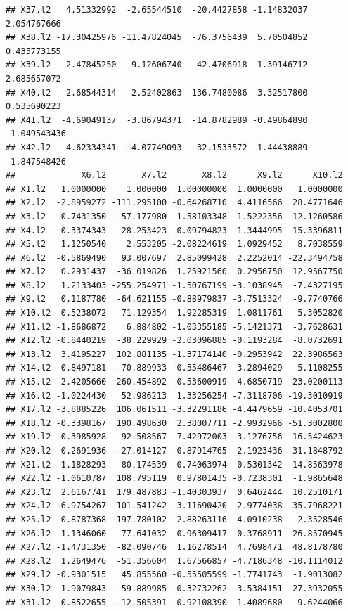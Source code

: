 \documentclass[]{article}
\begin{document}
\begin{verbatim}
## X37.l2   4.51332992  -2.65544510  -20.4427858 -1.14832037  2.054767666
## X38.l2 -17.30425976 -11.47824045  -76.3756439  5.70504852  0.435773155
## X39.l2  -2.47845250   9.12606740  -42.4706918 -1.39146712  2.685657072
## X40.l2   2.68544314   2.52402863  136.7480086  3.32517800  0.535690223
## X41.l2  -4.69049137  -3.86794371  -14.8782989 -0.49864890 -1.049543436
## X42.l2  -4.62334341  -4.07749093   32.1533572  1.44438889 -1.847548426
##             X6.l2       X7.l2       X8.l2      X9.l2      X10.l2
## X1.l2   1.0000000    1.000000  1.00000000  1.0000000   1.0000000
## X2.l2  -2.8959272 -111.295100 -0.64268710  4.4116566  28.4771646
## X3.l2  -0.7431350  -57.177980 -1.58103348 -1.5222356  12.1260586
## X4.l2   0.3374343   28.253423  0.09794823 -1.3444995  15.3396811
## X5.l2   1.1250540    2.553205 -2.08224619  1.0929452   8.7038559
## X6.l2  -0.5869490   93.007697  2.85099428  2.2252014 -22.3494758
## X7.l2   0.2931437  -36.019826  1.25921560  0.2956750  12.9567750
## X8.l2   1.2133403 -255.254971 -1.50767199 -3.1038945  -7.4327195
## X9.l2   0.1187780  -64.621155 -0.88979837 -3.7513324  -9.7740766
## X10.l2  0.5238072   71.129354  1.92285319  1.0811761   5.3052820
## X11.l2 -1.8686872    6.884802 -1.03355185 -5.1421371  -3.7628631
## X12.l2 -0.8440219  -38.229929 -2.03096885 -0.1193284  -8.0732691
## X13.l2  3.4195227  102.881135 -1.37174140 -0.2953942  22.3986563
## X14.l2  0.8497181  -70.889933  0.55486467  3.2894029  -5.1108255
## X15.l2 -2.4205660 -260.454892 -0.53600919 -4.6850719 -23.0200113
## X16.l2 -1.0224430   52.986213  1.33256254 -7.3118706 -19.3010919
## X17.l2 -3.8885226  106.061511 -3.32291186 -4.4479659 -10.4053701
## X18.l2 -0.3398167  190.498630  2.38007711 -2.9932966 -51.3002800
## X19.l2 -0.3985928   92.508567  7.42972003 -3.1276756  16.5424623
## X20.l2 -0.2691936  -27.014127 -0.87914765 -2.1923436 -31.1848792
## X21.l2 -1.1828293   80.174539  0.74063974  0.5301342  14.8563978
## X22.l2 -1.0610787  108.795119  0.97801435 -0.7238301  -1.9865648
## X23.l2  2.6167741  179.487883 -1.40303937  0.6462444  10.2510171
## X24.l2 -6.9754267 -101.541242  3.11690420  2.9774038  35.7968221
## X25.l2 -0.8787368  197.780102 -2.88263116 -4.0910238   2.3528546
## X26.l2  1.1346060   77.641032  0.96309417  0.3768911 -26.8570945
## X27.l2 -1.4731350  -82.090746  1.16278514  4.7698471  48.8178780
## X28.l2  1.2649476  -51.356604  1.67566857 -4.7186348 -10.1114012
## X29.l2 -0.9301515   45.855560 -0.55505599 -1.7741743  -1.9013082
## X30.l2  1.9079843  -59.889985 -0.32732262 -3.5384151 -27.3932055
## X31.l2  0.8522655  -12.505391 -0.92108390  1.4089680  -9.6244066

\end{verbatim}
\end{document}
